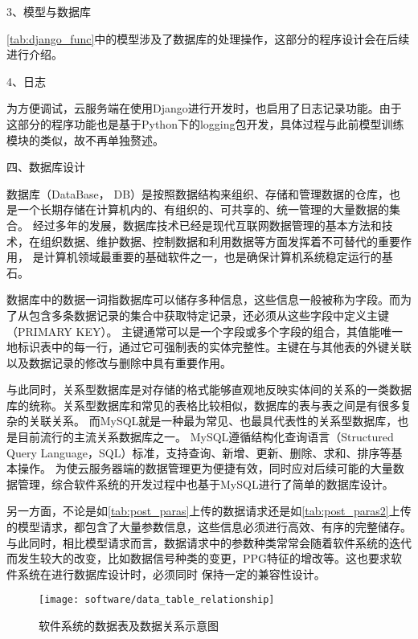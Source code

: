 3、模型与数据库

\autoref{tab:django_func}中的模型涉及了数据库的处理操作，这部分的程序设计会在后续进行介绍。

4、日志

为方便调试，云服务端在使用Django进行开发时，也启用了日志记录功能。由于这部分的程序功能也是基于Python下的logging包开发，具体过程与此前模型训练模块的类似，故不再单独赘述。

四、数据库设计

数据库（DataBase， DB）是按照数据结构来组织、存储和管理数据的仓库，也是一个长期存储在计算机内的、有组织的、可共享的、统一管理的大量数据的集合。
经过多年的发展，数据库技术已经是现代互联网数据管理的基本方法和技术，在组织数据、维护数据、控制数据和利用数据等方面发挥着不可替代的重要作用，
是计算机领域最重要的基础软件之一，也是确保计算机系统稳定运行的基石。

数据库中的数据一词指数据库可以储存多种信息，这些信息一般被称为字段。而为了从包含多条数据记录的集合中获取特定记录，还必须从这些字段中定义主键（PRIMARY KEY）。
主键通常可以是一个字段或多个字段的组合，其值能唯一地标识表中的每一行，通过它可强制表的实体完整性。主键在与其他表的外键关联以及数据记录的修改与删除中具有重要作用。

与此同时，关系型数据库是对存储的格式能够直观地反映实体间的关系的一类数据库的统称。关系型数据库和常见的表格比较相似，数据库的表与表之间是有很多复杂的关联关系。
而MySQL就是一种最为常见、也最具代表性的关系型数据库，也是目前流行的主流关系数据库之一。
MySQL遵循结构化查询语言（Structured Query Language，SQL）标准，支持查询、新增、更新、删除、求和、排序等基本操作。
为使云服务器端的数据管理更为便捷有效，同时应对后续可能的大量数据管理，综合软件系统的开发过程中也基于MySQL进行了简单的数据库设计。

另一方面，不论是如\autoref{tab:post_paras}上传的数据请求还是如\autoref{tab:post_paras2}上传的模型请求，都包含了大量参数信息，这些信息必须进行高效、有序的完整储存。
与此同时，相比模型请求而言，数据请求中的参数种类常常会随着软件系统的迭代而发生较大的改变，比如数据信号种类的变更，PPG特征的增改等。这也要求软件系统在进行数据库设计时，必须同时
保持一定的兼容性设计。

\begin{figure}[htbp]
    \centering
    \texttt{[image: software/data\_table\_relationship]}
    \caption{\label{fig:data_table_relationship}软件系统的数据表及数据关系示意图}
\end{figure}

